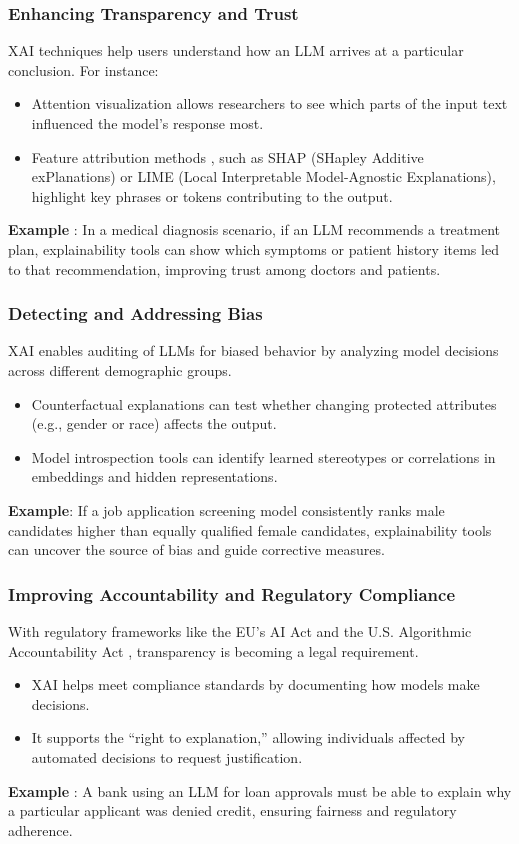 \documentclass[conference]{IEEEtran}
\begin{document}
\subsubsection{Enhancing Transparency and Trust}
XAI techniques help users understand how an LLM arrives at a particular conclusion. For instance:
\begin{itemize}
    \item Attention visualization allows researchers to see which parts of the input text influenced the model's response most.
    \item Feature attribution methods , such as SHAP (SHapley Additive exPlanations) or LIME (Local Interpretable Model-Agnostic Explanations), highlight key phrases or tokens contributing to the output.
\end{itemize}
\textbf{Example} : In a medical diagnosis scenario, if an LLM recommends a treatment plan, explainability tools can show which symptoms or patient history items led to that recommendation, improving trust among doctors and patients.

\subsubsection{Detecting and Addressing Bias}
XAI enables auditing of LLMs for biased behavior by analyzing model decisions across different demographic groups.
\begin{itemize}
    \item Counterfactual explanations can test whether changing protected attributes (e.g., gender or race) affects the output.
    \item Model introspection tools can identify learned stereotypes or correlations in embeddings and hidden representations.
\end{itemize}
\textbf{Example}: If a job application screening model consistently ranks male candidates higher than equally qualified female candidates, explainability tools can uncover the source of bias and guide corrective measures.

\subsubsection{Improving Accountability and Regulatory Compliance}
With regulatory frameworks like the EU’s AI Act and the U.S. Algorithmic Accountability Act , transparency is becoming a legal requirement.
\begin{itemize}
    \item XAI helps meet compliance standards by documenting how models make decisions.
    \item It supports the “right to explanation,” allowing individuals affected by automated decisions to request justification.
\end{itemize}
\textbf{Example} : A bank using an LLM for loan approvals must be able to explain why a particular applicant was denied credit, ensuring fairness and regulatory adherence.
\end{document}
